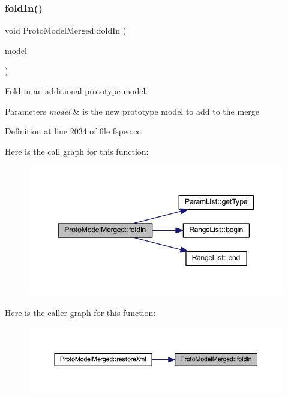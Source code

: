 \subsubsection{\texorpdfstring{foldIn()}{foldIn()}}
{\footnotesize\ttfamily void Proto\+Model\+Merged\+::fold\+In (\begin{DoxyParamCaption}\item[{\mbox{\hyperlink{class_proto_model}{Proto\+Model}} $\ast$}]{model }\end{DoxyParamCaption})}



Fold-\/in an additional prototype model. 


\begin{DoxyParams}{Parameters}
{\em model} & is the new prototype model to add to the merge \\
\hline
\end{DoxyParams}


Definition at line 2034 of file fspec.\+cc.

Here is the call graph for this function\+:
\nopagebreak
\begin{figure}[H]
\begin{center}
\leavevmode
\includegraphics[width=344pt]{class_proto_model_merged_a735f43c1161758dcb6e8e2caf6e1c51c_cgraph}
\end{center}
\end{figure}
Here is the caller graph for this function\+:
\nopagebreak
\begin{figure}[H]
\begin{center}
\leavevmode
\includegraphics[width=350pt]{class_proto_model_merged_a735f43c1161758dcb6e8e2caf6e1c51c_icgraph}
\end{center}
\end{figure}
\mbox{\label{class_proto_model_merged_a661295ea5cf3542cfc25b28fefb6a264}} 

